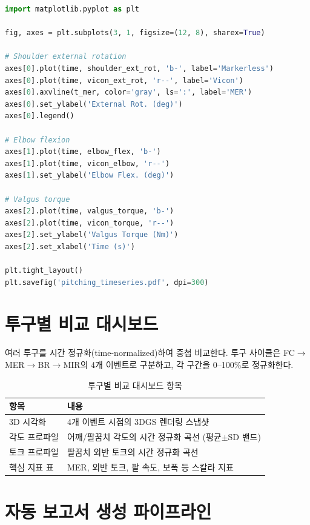 \documentclass[11pt, a4paper]{report}
\begin{document}
\begin{codebox}[title={시계열 플롯 생성}]
\begin{lstlisting}[language=Python]
import matplotlib.pyplot as plt

fig, axes = plt.subplots(3, 1, figsize=(12, 8), sharex=True)

# Shoulder external rotation
axes[0].plot(time, shoulder_ext_rot, 'b-', label='Markerless')
axes[0].plot(time, vicon_ext_rot, 'r--', label='Vicon')
axes[0].axvline(t_mer, color='gray', ls=':', label='MER')
axes[0].set_ylabel('External Rot. (deg)')
axes[0].legend()

# Elbow flexion
axes[1].plot(time, elbow_flex, 'b-')
axes[1].plot(time, vicon_elbow, 'r--')
axes[1].set_ylabel('Elbow Flex. (deg)')

# Valgus torque
axes[2].plot(time, valgus_torque, 'b-')
axes[2].plot(time, vicon_torque, 'r--')
axes[2].set_ylabel('Valgus Torque (Nm)')
axes[2].set_xlabel('Time (s)')

plt.tight_layout()
plt.savefig('pitching_timeseries.pdf', dpi=300)
\end{lstlisting}
\end{codebox}

\section{투구별 비교 대시보드}

여러 투구를 시간 정규화(time-normalized)하여 중첩 비교한다.
투구 사이클은 FC$\rightarrow$MER$\rightarrow$BR$\rightarrow$MIR의 4개 이벤트로 구분하고,
각 구간을 0--100\%로 정규화한다.

\begin{table}[H]
\centering
\caption{투구별 비교 대시보드 항목}
\begin{tabularx}{\textwidth}{lX}
\toprule
\textbf{항목} & \textbf{내용} \\
\midrule
3D 시각화 & 4개 이벤트 시점의 3DGS 렌더링 스냅샷 \\
각도 프로파일 & 어깨/팔꿈치 각도의 시간 정규화 곡선 (평균$\pm$SD 밴드) \\
토크 프로파일 & 팔꿈치 외반 토크의 시간 정규화 곡선 \\
핵심 지표 표 & MER, 외반 토크, 팔 속도, 보폭 등 스칼라 지표 \\
\bottomrule
\end{tabularx}
\end{table}

\section{자동 보고서 생성 파이프라인}
\end{document}
